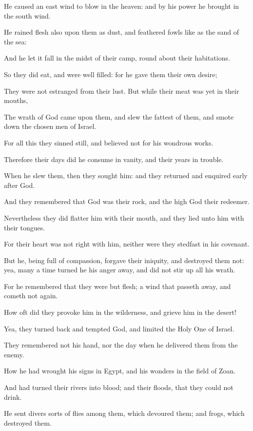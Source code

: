 \verse He caused an east wind to blow in the heaven: and by his power he brought in the south wind.

\verse He rained flesh also upon them as dust, and feathered fowls like as the sand of the sea:

\verse And he let it fall in the midst of their camp, round about their habitations.

\verse So they did eat, and were well filled: for he gave them their own desire;

\verse They were not estranged from their lust. But while their meat was yet in their mouths,

\verse The wrath of God came upon them, and slew the fattest of them, and smote down the chosen men of Israel.

\verse For all this they sinned still, and believed not for his wondrous works.

\verse Therefore their days did he consume in vanity, and their years in trouble.

\verse When he slew them, then they sought him: and they returned and enquired early after God.

\verse And they remembered that God was their rock, and the high God their redeemer.

\verse Nevertheless they did flatter him with their mouth, and they lied unto him with their tongues.

\verse For their heart was not right with him, neither were they stedfast in his covenant.

\verse But he, being full of compassion, forgave their iniquity, and destroyed them not: yea, many a time turned he his anger away, and did not stir up all his wrath.

\verse For he remembered that they were but flesh; a wind that passeth away, and cometh not again.

\verse How oft did they provoke him in the wilderness, and grieve him in the desert!

\verse Yea, they turned back and tempted God, and limited the Holy One of Israel.

\verse They remembered not his hand, nor the day when he delivered them from the enemy.

\verse How he had wrought his signs in Egypt, and his wonders in the field of Zoan.

\verse And had turned their rivers into blood; and their floods, that they could not drink.

\verse He sent divers sorts of flies among them, which devoured them; and frogs, which destroyed them.

